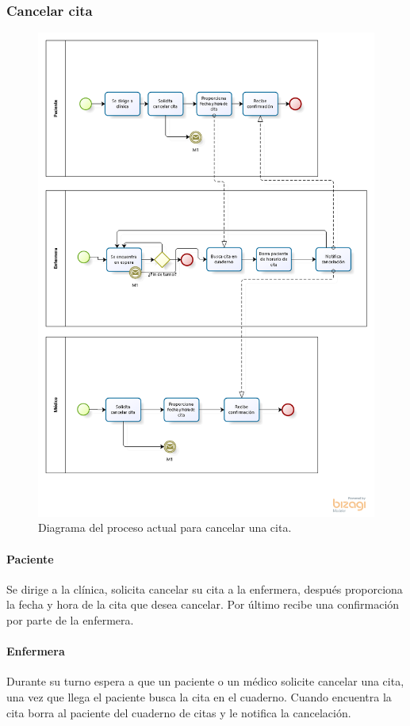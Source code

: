 \subsubsection{Cancelar cita}
	\begin{figure}[htbp!]
		\centering
		\includegraphics[width=\textwidth]{images/procesos/cancelar_cita_old}
		\caption{Diagrama del proceso actual para cancelar una cita.}
	\end{figure}
	\paragraph{Paciente}
	Se dirige a la clínica, solicita cancelar su cita a la enfermera, después proporciona la fecha y hora de la cita que desea cancelar. Por último recibe una confirmación por parte de la enfermera.
	\paragraph{Enfermera}
	Durante su turno espera a que un paciente o un médico solicite cancelar una cita, una vez que llega el paciente busca la cita en el cuaderno. Cuando encuentra la cita borra al paciente del cuaderno de citas y le notifica la cancelación.
